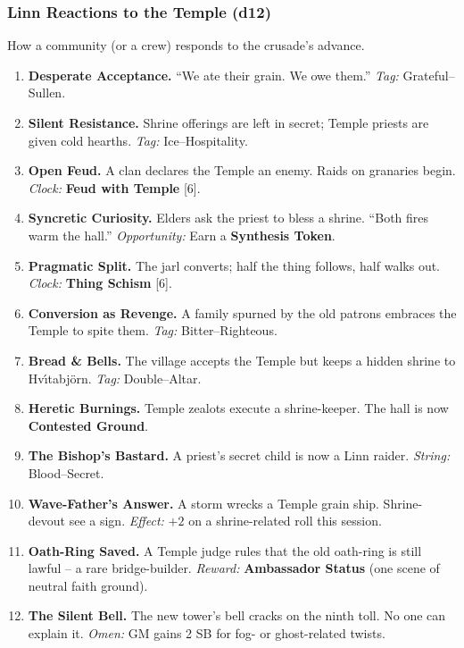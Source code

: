 \subsubsection*{Linn Reactions to the Temple (d12)}
How a community (or a crew) responds to the crusade's advance.
\begin{enumerate}[label=\arabic*., wide=0pt]
    \item \textbf{Desperate Acceptance.} ``We ate their grain. We owe them.'' \textit{Tag:} Grateful--Sullen.
    \item \textbf{Silent Resistance.} Shrine offerings are left in secret; Temple priests are given cold hearths. \textit{Tag:} Ice--Hospitality.
    \item \textbf{Open Feud.} A clan declares the Temple an enemy. Raids on granaries begin. \textit{Clock:} \textbf{Feud with Temple} [6].
    \item \textbf{Syncretic Curiosity.} Elders ask the priest to bless a shrine. ``Both fires warm the hall.'' \textit{Opportunity:} Earn a \textbf{Synthesis Token}.
    \item \textbf{Pragmatic Split.} The jarl converts; half the thing follows, half walks out. \textit{Clock:} \textbf{Thing Schism} [6].
    \item \textbf{Conversion as Revenge.} A family spurned by the old patrons embraces the Temple to spite them. \textit{Tag:} Bitter--Righteous.
    \item \textbf{Bread \& Bells.} The village accepts the Temple but keeps a hidden shrine to Hv\'{\i}tabj\"{o}rn. \textit{Tag:} Double--Altar.
    \item \textbf{Heretic Burnings.} Temple zealots execute a shrine-keeper. The hall is now \textbf{Contested Ground}.
    \item \textbf{The Bishop's Bastard.} A priest's secret child is now a Linn raider. \textit{String:} Blood--Secret.
    \item \textbf{Wave-Father's Answer.} A storm wrecks a Temple grain ship. Shrine-devout see a sign. \textit{Effect:} $+2$ on a shrine-related roll this session.
    \item \textbf{Oath-Ring Saved.} A Temple judge rules that the old oath-ring is still lawful -- a rare bridge-builder. \textit{Reward:} \textbf{Ambassador Status} (one scene of neutral faith ground).
    \item \textbf{The Silent Bell.} The new tower's bell cracks on the ninth toll. No one can explain it. \textit{Omen:} GM gains 2 SB for fog- or ghost-related twists.
\end{enumerate}

